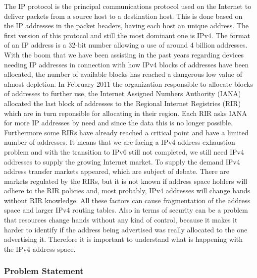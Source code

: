 \documentclass[11pt,a4paper]{scrreprt}
\begin{document}
The IP protocol is the principal communications protocol used on the Internet to deliver packets from a source host to a destination host. This is done based on the IP addresses in the packet headers, having each host an unique address. 
The first version of this protocol and still the most dominant one is IPv4. The format of an IP address is a 32-bit number allowing a use of around 4 billion addresses. With the boom that we have been assisting in the past years regarding devices needing IP addresses in connection with how IPv4 blocks of addresses have been allocated, the number of available blocks has reached a dangerous low value of almost depletion.      
In February 2011 the organization responsible to allocate blocks of addresses to further use, the Internet Assigned Numbers Authority (IANA) allocated the last block of addresses to the Regional Internet Registries (RIR) which are in turn reponsible for allocating in their region. Each RIR asks IANA for more IP addresses by need and since the data this is no longer possible. Furthermore some RIRs have already reached a critical point and have a limited number of addresses. It means that we are facing a IPv4 address exhaustion problem and with the transition to IPv6 still not completed, we still need IPv4 addresses to supply the growing Internet market. To supply the demand IPv4 address transfer markets appeared, which are subject of debate. There are markets regulated by the RIRs, but it is not known if address space holders will adhere to the RIR policies and, most probably, IPv4 addresses will change hands without RIR knowledge.
All these factors can cause fragmentation of the address space and larger IPv4 routing tables. Also in terms of security can be a problem that resources change hands without any kind of control, because it makes it harder to identify if the address being advertised was really allocated to the one advertising it. 
Therefore it is important to understand what is happening with the IPv4 address space. 

\subsubsection{Problem Statement}
\end{document}
